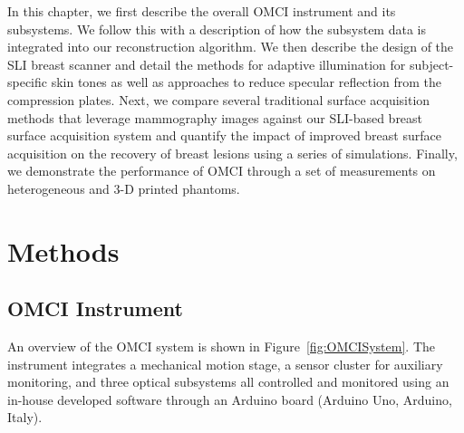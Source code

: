 In this chapter, we first describe the overall \ac{OMCI} instrument and its subsystems. We follow this with a description of how the subsystem data is integrated into our reconstruction algorithm. We then describe the design of the \ac{SLI} breast scanner and detail the methods for adaptive illumination for subject-specific skin tones as well as approaches to reduce specular reflection from the compression plates. Next, we compare several traditional surface acquisition methods that leverage mammography images against our \ac{SLI}-based breast surface acquisition system and quantify the impact of improved breast surface acquisition on the recovery of breast lesions using a series of simulations. Finally, we demonstrate the performance of \ac{OMCI} through a set of measurements on heterogeneous and 3-D printed phantoms.



\section{Methods}
\label{chap:omci:methods}

\subsection{OMCI Instrument}
An overview of the \ac{OMCI} system is shown in Figure~\ref{fig:OMCISystem}. The instrument integrates a mechanical motion stage, a sensor cluster for auxiliary monitoring, and three optical subsystems all controlled and monitored using an in-house developed software through an Arduino board (Arduino Uno, Arduino, Italy). 

